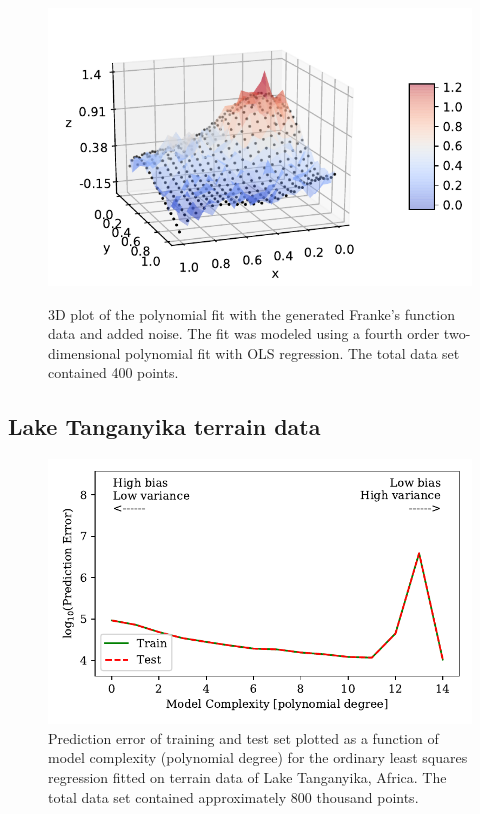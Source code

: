 \documentclass[a4paper, 10pt]{article}
\begin{document}
\begin{figure}[H]
	\includegraphics[scale=1]{figs/3dmodel_OLS_Franke.pdf}
	\label{fig:3d_OLS_Franke}
	\caption{3D plot of the polynomial fit with the generated Franke's function data and added noise. The fit was modeled using a fourth order two-dimensional polynomial fit with OLS regression. The total data set contained 400 points.}
\end{figure}




\subsection{Lake Tanganyika terrain data}


\begin{figure}[H]
    \includegraphics[scale=1]{figs/biasvariancetradeoff_ols_terrain.pdf}
    \caption{Prediction error of training and test set plotted as a function of model complexity (polynomial degree) for the ordinary least squares regression  fitted on terrain data of Lake Tanganyika, Africa. The total data set contained approximately 800 thousand points.}
    \label{fig:bias_ols_terrain}
\end{figure}
\end{document}
